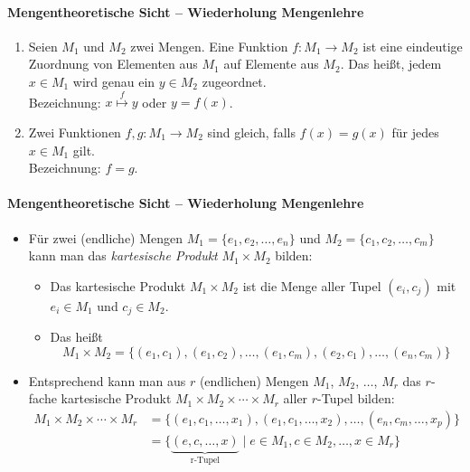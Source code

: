 \begin{frame}{\insertsection}
\framesubtitle{Mengentheoretische Sicht -- Wiederholung Mengenlehre}
\begin{definition}[Funktion]
\begin{enumerate}
	\item 
	Seien $M_1$ und $M_2$ zwei Mengen. Eine Funktion $f:M_1\to M_2$ ist eine eindeutige Zuordnung von Elementen 
	aus $M_1$ auf Elemente aus $M_2$. Das hei\ss t, jedem $x\in M_1$ wird genau ein $y\in M_2$ zugeordnet. 
	\\[4pt]
	Bezeichnung: $x\overset{f}{\mapsto} y$ oder $y=f(x)$.
	\\[4pt]
	\item Zwei Funktionen $f,g:M_1\to M_2$ sind gleich, falls $f(x)=g(x)$ f\"ur jedes $x\in M_1$ gilt. 
	\\[4pt]
	Bezeichnung: $f=g$.
\end{enumerate}
\end{definition}
\end{frame}

\begin{frame}{\insertsection}
\framesubtitle{Mengentheoretische Sicht -- Wiederholung Mengenlehre}
\begin{itemize}
	\onslide
	\item Für zwei (endliche) Mengen $M_1=\{e_1, e_2,\ldots , e_n\}$ und $M_2=\{c_1, c_2, \ldots , c_m\}$ kann man das \emph{kartesische Produkt} 
	$M_1\times M_2$ bilden:
	\begin{itemize} 
		\item Das kartesische Produkt $M_1\times M_2$ ist die Menge aller Tupel $(e_i,c_j)$ mit $e_i\in M_1$ und $c_j\in M_2$.
		\item Das hei\ss t
		\begin{equation*}
		M_1\times M_2=\{(e_1,c_1), (e_1,c_2),\ldots, (e_1,c_m),(e_2,c_1), \ldots, (e_n,c_m)\}
		\end{equation*}
	\end{itemize}
  \pause
	\item Entsprechend kann man aus $r$ (endlichen) Mengen $M_1$, $M_2$, $\ldots$, $M_r$ das $r$-fache kartesische Produkt 
	$M_1\times M_2 \times \cdots \times M_r$ aller $r$-Tupel bilden:
	\begin{equation*}
	\begin{split}
	M_1\times M_2 \times \cdots \times M_r &=\{(e_1,c_1, \ldots, x_1), (e_1,c_1,\ldots, x_2),\ldots, (e_n,c_m, \ldots, x_p)\}\\
	&=\{\underbrace{(e,c,\ldots,x)}_\text{r-Tupel} \mid e\in M_1, c\in M_2,\ldots ,x\in M_r\}
	\end{split} 
	\end{equation*} 
\end{itemize}
\end{frame}

